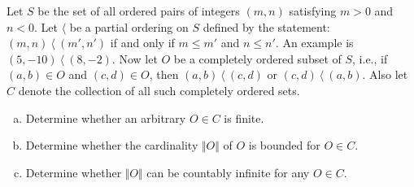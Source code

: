 Let $S$ be the set of all ordered pairs of integers $(m, n)$ satisfying $m > 0$
and $n < 0$. Let $\langle$ be a partial ordering on $S$ defined by the statement:
$(m, n) \ \langle\ (m', n')$ if and only if $m \le m'$ and $n \le n'$. An example
is $(5, - 10) \ \langle\ (8, - 2)$. Now let $O$ be a completely ordered subset of
$S$, i.e., if $(a, b) \in O$ and $(c, d ) \in O$, then $(a, b) \ \langle\ (c, d )$
or $(c, d ) \ \langle\  (a, b)$. Also let $C$ denote the collection of all such
completely ordered sets.

\begin{enumerate}[(a)]

\item Determine whether an arbitrary $O \in C$ is finite.
\item Determine whether the cardinality $\Vert O \Vert$ of $O$ is bounded for $O \in C$.
\item Determine whether $\Vert O \Vert$ can be countably infinite for any $O \in C$.

\end{enumerate}
